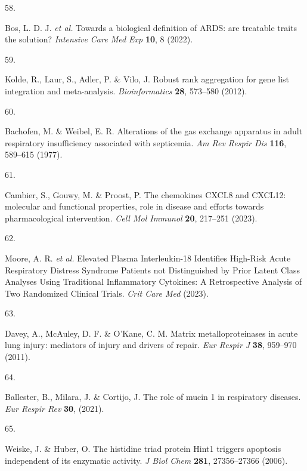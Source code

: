 \documentclass[
  11,
  a4paper,
]{article}
\newlength{\cslhangindent}
\newlength{\csllabelwidth}
\newlength{\cslentryspacingunit} %
\newenvironment{CSLReferences}[2] %
 {%
  \setlength{\parindent}{0pt}
  \ifodd #1
  \let\oldpar\par
  \def\par{\hangindent=\cslhangindent\oldpar}
  \fi
  \setlength{\parskip}{#2\cslentryspacingunit}
 }%
 {}
\newcommand{\CSLLeftMargin}[1]{\parbox[t]{\csllabelwidth}{#1}}
\newcommand{\CSLRightInline}[1]{\parbox[t]{\linewidth - \csllabelwidth}{#1}\break}
\begin{document}
\begin{CSLReferences}{0}{0}
\leavevmode{}%
\CSLLeftMargin{58. }%
\CSLRightInline{Bos, L. D. J. \emph{et al.} {{T}owards a biological
definition of {A}{R}{D}{S}: are treatable traits the solution?}
\emph{Intensive Care Med Exp} \textbf{10}, 8 (2022).}

\leavevmode{}%
\CSLLeftMargin{59. }%
\CSLRightInline{Kolde, R., Laur, S., Adler, P. \& Vilo, J. {{R}obust
rank aggregation for gene list integration and meta-analysis}.
\emph{Bioinformatics} \textbf{28}, 573--580 (2012).}

\leavevmode{}%
\CSLLeftMargin{60. }%
\CSLRightInline{Bachofen, M. \& Weibel, E. R. {{A}lterations of the gas
exchange apparatus in adult respiratory insufficiency associated with
septicemia}. \emph{Am Rev Respir Dis} \textbf{116}, 589--615 (1977).}

\leavevmode{}%
\CSLLeftMargin{61. }%
\CSLRightInline{Cambier, S., Gouwy, M. \& Proost, P. {{T}he chemokines
{C}{X}{C}{L}8 and {C}{X}{C}{L}12: molecular and functional properties,
role in disease and efforts towards pharmacological intervention}.
\emph{Cell Mol Immunol} \textbf{20}, 217--251 (2023).}

\leavevmode{}%
\CSLLeftMargin{62. }%
\CSLRightInline{Moore, A. R. \emph{et al.} {{E}levated {P}lasma
{I}nterleukin-18 {I}dentifies {H}igh-{R}isk {A}cute {R}espiratory
{D}istress {S}yndrome {P}atients not {D}istinguished by {P}rior {L}atent
{C}lass {A}nalyses {U}sing {T}raditional {I}nflammatory {C}ytokines: {A}
{R}etrospective {A}nalysis of {T}wo {R}andomized {C}linical {T}rials}.
\emph{Crit Care Med} (2023).}

\leavevmode{}%
\CSLLeftMargin{63. }%
\CSLRightInline{Davey, A., McAuley, D. F. \& O'Kane, C. M. {{M}atrix
metalloproteinases in acute lung injury: mediators of injury and drivers
of repair}. \emph{Eur Respir J} \textbf{38}, 959--970 (2011).}

\leavevmode{}%
\CSLLeftMargin{64. }%
\CSLRightInline{Ballester, B., Milara, J. \& Cortijo, J. {{T}he role of
mucin 1 in respiratory diseases}. \emph{Eur Respir Rev} \textbf{30},
(2021).}

\leavevmode{}%
\CSLLeftMargin{65. }%
\CSLRightInline{Weiske, J. \& Huber, O. {{T}he histidine triad protein
{H}int1 triggers apoptosis independent of its enzymatic activity}.
\emph{J Biol Chem} \textbf{281}, 27356--27366 (2006).}


\end{CSLReferences}
\end{document}

